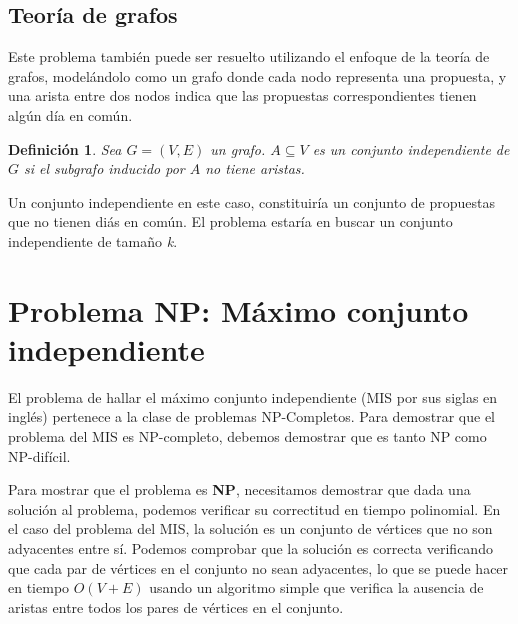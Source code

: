 \documentclass[10pt]{article} %
\newtheorem{mydef}{Definici\'on}%
\begin{document}
	
	\subsection{Teor\'ia de grafos}
	Este problema tambi\'en puede ser resuelto utilizando el enfoque de la teoría de grafos, model\'andolo como un grafo donde cada nodo representa una propuesta, y una arista entre dos nodos indica que las propuestas correspondientes tienen alg\'un d\'ia en com\'un. 
	
	\begin{mydef}
		Sea $G = (V, E)$ un grafo. $A \subseteq V$ es un conjunto independiente de $G$ si el subgrafo inducido por $A$ no tiene aristas.  
	\end{mydef}
	
	Un conjunto independiente en este caso, constituir\'ia un conjunto de propuestas que no tienen di\'as en com\'un. El problema estar\'ia en buscar un conjunto independiente de tama\~no \textit{k}.
	
	\section{Problema NP: M\'aximo conjunto independiente}
	
	El problema de hallar el m\'aximo conjunto independiente (MIS por sus siglas en ingl\'es) pertenece a la clase de problemas NP-Completos. Para demostrar que el problema del MIS es NP-completo, debemos demostrar que es tanto NP como NP-difícil.
	
	Para mostrar que el problema es \textbf{NP}, necesitamos demostrar que dada una solución al problema, podemos verificar su correctitud en tiempo polinomial. En el caso del problema del MIS, la solución es un conjunto de vértices que no son adyacentes entre sí. Podemos comprobar que la solución es correcta verificando que cada par de vértices en el conjunto no sean adyacentes, lo que se puede hacer en tiempo $O(V+E)$ usando un algoritmo simple que verifica la ausencia de aristas entre todos los pares de vértices en el conjunto.
	
\end{document}
